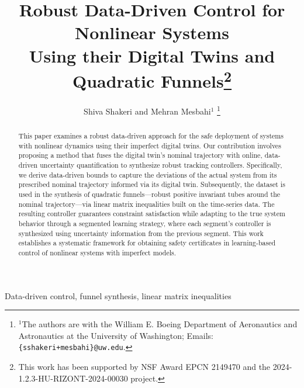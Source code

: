 \documentclass[letterpaper, 10 pt, conference]{ieeeconf}
\title{\LARGE \bf
Robust Data-Driven Control for Nonlinear Systems\\Using their Digital Twins and Quadratic Funnels\thanks{This work has been supported by NSF Award EPCN 2149470 and the 2024-1.2.3-HU-RIZONT-2024-00030 project.}
}
\author{Shiva Shakeri and Mehran Mesbahi$^{1}$
\thanks{$^{1}$The authors are with the William E. Boeing Department of Aeronautics and Astronautics at the University of Washington; Emails: {\tt \{sshakeri+mesbahi\}@uw.edu}.}
}
\begin{document}
\maketitle
\thispagestyle{empty}
\pagestyle{empty}


\begin{abstract}
This paper examines a robust data-driven approach for the safe deployment of systems with nonlinear dynamics using their imperfect digital twins. Our contribution involves proposing a method that fuses the digital twin's nominal trajectory with online, data-driven uncertainty quantification to synthesize robust tracking controllers. Specifically, we derive data-driven bounds to capture the deviations of the actual system from its prescribed nominal trajectory informed via its digital twin. Subsequently, the dataset is used in the synthesis of quadratic funnels—robust positive invariant tubes around the nominal trajectory—via linear matrix inequalities built on the time-series data. The resulting controller guarantees constraint satisfaction while adapting to the true system behavior through a segmented learning strategy, where each segment's controller is synthesized using uncertainty information from the previous segment. This work establishes a systematic framework for obtaining safety certificates in learning-based control of nonlinear systems with imperfect models.
\end{abstract}
\begin{keywords}
Data-driven control, funnel synthesis, linear matrix inequalities
\end{keywords}
\end{document}
